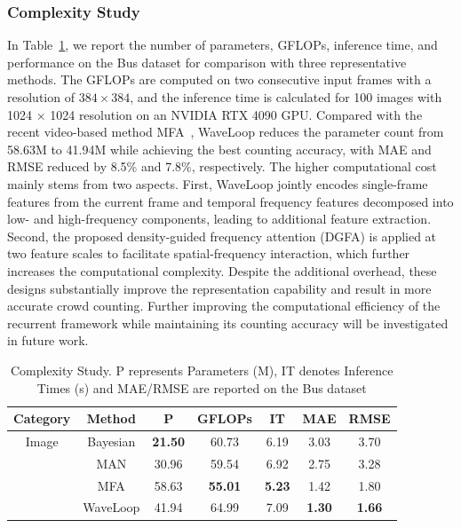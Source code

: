\documentclass[lettersize,journal]{IEEEtran}
\begin{document}
\subsubsection{Complexity Study}
In Table~\ref{tab:8}, we report the number of parameters, GFLOPs, inference time, and  performance on the Bus dataset for comparison with three representative methods. The GFLOPs are computed on two consecutive input frames with a resolution of $384\times384$, and the inference time is calculated for 100 images with 1024 × 1024 resolution on an NVIDIA RTX 4090 GPU. Compared with the recent video-based method MFA~\cite{ling2023motional}, WaveLoop reduces the parameter count from 58.63M to 41.94M while achieving the best counting accuracy, with MAE and RMSE reduced by 8.5\% and 7.8\%, respectively. The higher computational cost mainly stems from two aspects. First, WaveLoop jointly encodes single-frame features from the current frame and temporal frequency features decomposed into low- and high-frequency components, leading to additional feature extraction. Second, the proposed density-guided frequency attention (DGFA) is applied at two feature scales to facilitate spatial-frequency interaction, which further increases the computational complexity. Despite the additional overhead, these designs substantially improve the representation capability and result in more accurate crowd counting. Further improving the computational efficiency of the recurrent framework while maintaining its counting accuracy will be investigated in future work.


\begin{table}[h]
\caption{Complexity Study. P represents Parameters (M), IT denotes Inference Times (s) and MAE/RMSE are reported on the Bus dataset}
  \centering
\scriptsize
    \begin{tabular}[]{ccccccc}
    \toprule
    Category & Method & P & GFLOPs & IT  & MAE & RMSE\\
    \midrule    
    Image & Bayesian \cite{ma2019bayesian} & \textbf{21.50} & 60.73 & 6.19 & 3.03 & 3.70\\  
     &  MAN \cite{lin2022boosting} & 30.96 & 59.54 & 6.92 & 2.75 & 3.28\\  
    \midrule
     & MFA \cite{ling2023motional} & 58.63 & \textbf{55.01} & \textbf{5.23}  & 1.42 & 1.80\\ 
     & WaveLoop  & 41.94 & 64.99 & 7.09 & \textbf{1.30} & \textbf{1.66} \\
    \bottomrule
    \end{tabular}
\label{tab:8}
\vspace{-1em}
\end{table}
\end{document}
